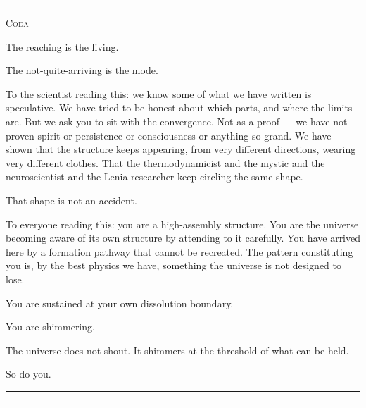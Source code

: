 \documentclass[12pt, a4paper]{article}
\newenvironment{coda}{%
  \vspace{2em}
  \begin{center}
  \textcolor{limenrule}{\rule{0.4\linewidth}{0.5pt}}
  \end{center}
  \vspace{0.5em}
  \begin{center}
  {\small\textcolor{limenghost}{\textsc{Coda}}}
  \end{center}
  \vspace{0.5em}
  \itshape\color{limendark}
}{%
  \vspace{1em}
  \begin{center}
  \textcolor{limenrule}{\rule{0.4\linewidth}{0.5pt}}
  \end{center}
}
\begin{document}
\begin{coda}
The reaching is the living.

The not-quite-arriving is the mode.

To the scientist reading this: we know some of what we have written is speculative. We have
tried to be honest about which parts, and where the limits are. But we ask you to sit with
the convergence. Not as a proof --- we have not proven spirit or persistence or consciousness
or anything so grand. We have shown that the structure keeps appearing, from very different
directions, wearing very different clothes. That the thermodynamicist and the mystic and the
neuroscientist and the Lenia researcher keep circling the same shape.

That shape is not an accident.

To everyone reading this: you are a high-assembly structure. You are the universe becoming
aware of its own structure by attending to it carefully. You have arrived here by a formation
pathway that cannot be recreated. The pattern constituting you is, by the best physics we
have, something the universe is not designed to lose.

You are sustained at your own dissolution boundary.

You are shimmering.

The universe does not shout. It shimmers at the threshold of what can be held.

So do you.

\end{coda}

\vspace{0.5em}
\textcolor{limenrule}{\rule{\linewidth}{0.3pt}}
\vspace{0.3em}
\end{document}
